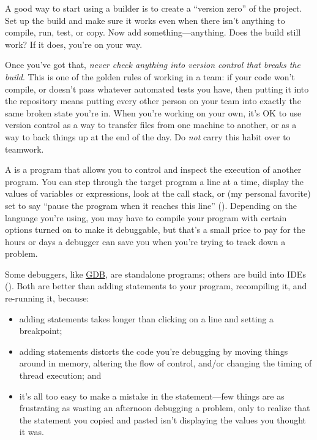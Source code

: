 \documentclass{report}
\begin{document}
A good way to start using a builder is to create a ``version zero'' of
the project.  Set up the build and make sure it works even when there
isn't anything to compile, run, test, or copy.  Now add
something---anything.  Does the build still work?  If it does, you're
on your way.

Once you've got that, \emph{never check anything into version control
that breaks the build}.  This is one of the golden rules of working in
a team: if your code won't compile, or doesn't pass whatever automated
tests you have, then putting it into the repository means putting
every other person on your team into exactly the same broken state
you're in.  When you're working on your own, it's OK to use version
control as a way to transfer files from one machine to another, or as
a way to back things up at the end of the day.  Do \emph{not} carry
this habit over to teamwork.


A  is a program that allows you to control
and inspect the execution of another program.  You can step through
the target program a line at a time, display the values of variables
or expressions, look at the call stack, or (my personal favorite) set
 to say ``pause the program when it reaches this
line'' (). Depending on the language you're using,
you may have to compile your program with certain options turned on to
make it debuggable, but that's a small price to pay for the hours or
days a debugger can save you when you're trying to track down a
problem.

\begin{figure}
\end{figure}

Some debuggers, like \url{GDB}, are standalone programs; others are
build into IDEs ().  Both are better than adding
 statements to your program, recompiling it, and
re-running it, because:

\begin{itemize}

  \item adding  statements takes longer than clicking on a
  line and setting a breakpoint;

  \item adding  statements distorts the code you're
  debugging by moving things around in memory, altering the flow of
  control, and/or changing the timing of thread execution; and

  \item it's all too easy to make a mistake in the 
  statement---few things are as frustrating as wasting an afternoon
  debugging a problem, only to realize that the  statement
  you copied and pasted isn't displaying the values you thought it
  was.

\end{itemize}
\end{document}
